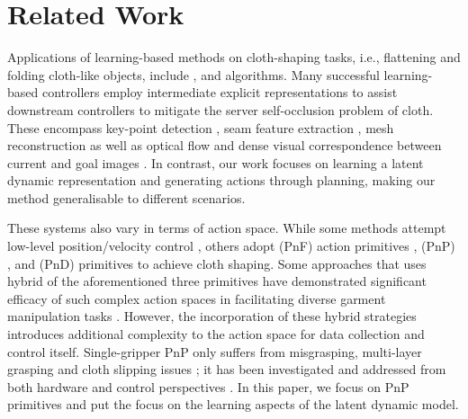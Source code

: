 \documentclass[journal]{IEEEtran}
\begin{document}
\section{Related Work} \label{sec:related-workd}


\noindent Applications of learning-based methods on cloth-shaping tasks, i.e., flattening and folding cloth-like objects, include  \cite{matas2018sim,wu2020learning,ha2022flingbot,hietala2022learning,lin2020softgym,lee2021learning, canberk2023cloth, he2024fabricfolding, gu2023learning, avigal2022speedfolding},  \cite{yan2021learning,hoque2022visuospatial,ma2021learning,arnold2023cloth,lin2020softgym,lin2022learning, huang2022mesh} and   \cite{lips2024learning,weng2022fabricflownet, teng2022multidimensional, mo2022foldsformer, huang2025sis, chi2023diffusionpolicy} algorithms. Many successful learning-based  controllers employ intermediate explicit representations to assist downstream controllers to mitigate the server self-occlusion problem of cloth. These encompass key-point detection \cite{lips2024learning, gusseme2025insights}, seam feature extraction \cite{huang2025sis}, mesh reconstruction \cite{huang2022mesh} as well as optical flow \cite{weng2022fabricflownet} and dense visual correspondence between current and goal images \cite{wu2024unigarmentmanip}. In contrast, our work focuses on learning a latent dynamic representation and generating actions through planning, making our method generalisable to different scenarios.

These systems also vary in terms of action space. While some methods attempt low-level position/velocity control \cite{matas2018sim,lin2020softgym, hietala2022learning,ha2022flingbot}, others adopt   (PnF) action primitives \cite{doumanoglou2014autonomous},  (PnP)  \cite{sun2015accurate}, and  (PnD) primitives \cite{he2024fabricfolding} to achieve cloth shaping. Some  approaches that uses hybrid of the aforementioned three primitives have demonstrated significant efficacy of such complex action spaces in facilitating diverse garment manipulation tasks \cite{avigal2022speedfolding, canberk2023cloth}. However, the incorporation of these hybrid strategies introduces additional complexity to the action space for data collection and control itself. Single-gripper PnP only suffers from misgrasping, multi-layer grasping and cloth slipping issues \cite{lin2022learning, hoque2022visuospatial}; it has been investigated and addressed from both hardware and control perspectives \cite{kadi2025draper, hoque2021lazydagger}. In this paper, we focus on PnP primitives and put the focus on the learning aspects of the latent dynamic model.
\end{document}
